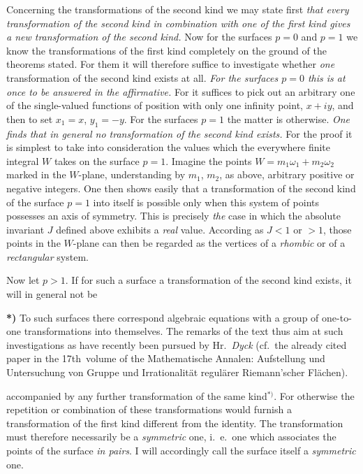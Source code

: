 \documentclass{article}
\begin{document}
Concerning the transformations of the second kind we may state first \emph{that every transformation of the second kind in combination with one of the first kind gives a new transformation of the second kind.} Now for the surfaces $p = 0$ and $p = 1$ we know the transformations of the first kind completely on the ground of the theorems stated. For them it will therefore suffice to investigate whether \emph{one} transformation of the second kind exists at all. \emph{For the surfaces $p = 0$ this is at once to be answered in the affirmative.} For it suffices to pick out an arbitrary one of the single-valued functions of position with only one infinity point, $x + iy$, and then to set $x_{1} = x$, $y_{1} = - y$. For the surfaces $p = 1$ the matter is otherwise. \emph{One finds that in general no transformation of the second kind exists.} For the proof it is simplest to take into consideration the values which the everywhere finite integral $W$ takes on the surface $p = 1$. Imagine the points $W = m_{1}\omega_{1} + m_{2}\omega_{2}$ marked in the $W$-plane, understanding by $m_{1}$, $m_{2}$, as above, arbitrary positive or negative integers. One then shows easily that a transformation of the second kind of the surface $p = 1$ into itself is possible only when this system of points possesses an axis of symmetry. This is precisely \emph{the} case in which the absolute invariant $J$ defined above exhibits a \emph{real} value. According as $J < 1$ or $> 1$, those points in the $W$-plane can then be regarded as the vertices of a \emph{rhombic} or of a \emph{rectangular} system.

Now let $p > 1$. If for such a surface a transformation of the second kind exists, it will in general not be

\textbf{*)} To such surfaces there correspond algebraic equations with a group of one-to-one transformations into themselves. The remarks of the text thus aim at such investigations as have recently been pursued by Hr.\ \emph{Dyck} (cf.\ the already cited paper in the 17th\ volume of the Mathematische Annalen: Aufstellung und Untersuchung von Gruppe und Irrationalität regulärer Riemann'scher Flächen).

accompanied by any further transformation of the same kind${}^{*)}$. For otherwise the repetition or combination of these transformations would furnish a transformation of the first kind different from the identity. The transformation must therefore necessarily be a \emph{symmetric} one, i.\ e.\ one which associates the points of the surface \emph{in pairs}. I will accordingly call the surface itself a \emph{symmetric} one.
\end{document}
